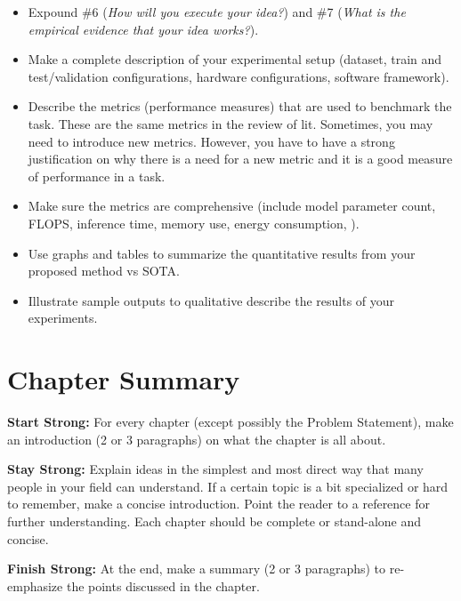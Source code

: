 \label{ch:results}

\begin{itemize}
    \item Expound \#6 (\emph{How will you execute your idea?}) and \#7 (\emph{What is the empirical evidence that your idea works?}).
    \item Make a complete description of your experimental setup (\eg dataset, train and test/validation configurations, hardware configurations, software framework).
    \item Describe the metrics (performance measures) that are used to benchmark the task. These are the same metrics in the review of lit. Sometimes, you may need to introduce new metrics. However, you have to have a strong justification on why there is a need for a new metric and it is a good measure of performance in a task.
    \item Make sure the metrics are comprehensive (\eg include model parameter count, FLOPS, inference time, memory use, energy consumption, \etc).
    \item Use graphs and tables to summarize the quantitative results from your proposed method vs SOTA.
    \item Illustrate sample outputs to qualitative describe the results of your experiments.
\end{itemize}

\section{Chapter Summary}

\textbf{Start Strong:} For every chapter (except possibly the Problem Statement), make an introduction (2 or 3 paragraphs) on what the chapter is all about.

\textbf{Stay Strong:} Explain ideas in the simplest and most direct way that many people in your field can understand. If a certain topic is a bit specialized or hard to remember, make a concise introduction. Point the reader to a reference for further understanding. Each chapter should be complete or stand-alone and concise.

\textbf{Finish Strong:} At the end, make a summary (2 or 3 paragraphs) to re-emphasize the points discussed in the chapter.
